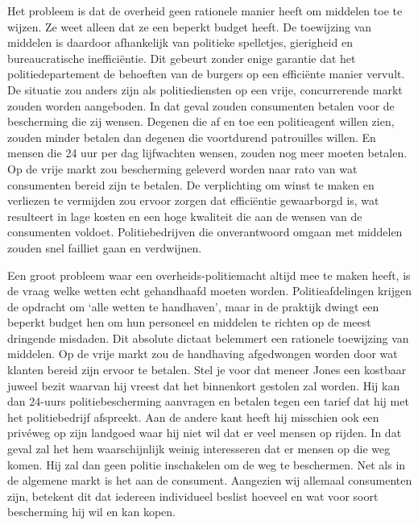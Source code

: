 \documentclass[
  a5paper,
  smalldemyvopaper,10pt,twoside,onecolumn,openright,extrafontsizes,hidelinks]{memoir}
\begin{document}
Het probleem is dat de overheid geen rationele manier heeft om middelen
toe te wijzen. Ze weet alleen dat ze een beperkt budget heeft. De
toewijzing van middelen is daardoor afhankelijk van politieke
spelletjes, gierigheid en bureaucratische inefficiëntie. Dit gebeurt
zonder enige garantie dat het politiedepartement de behoeften van de
burgers op een efficiënte manier vervult. De situatie zou anders zijn
als politiediensten op een vrije, concurrerende markt zouden worden
aangeboden. In dat geval zouden consumenten betalen voor de bescherming
die zij wensen. Degenen die af en toe een politieagent willen zien,
zouden minder betalen dan degenen die voortdurend patrouilles willen. En
mensen die 24 uur per dag lijfwachten wensen, zouden nog meer moeten
betalen. Op de vrije markt zou bescherming geleverd worden naar rato van
wat consumenten bereid zijn te betalen. De verplichting om winst te
maken en verliezen te vermijden zou ervoor zorgen dat efficiëntie
gewaarborgd is, wat resulteert in lage kosten en een hoge kwaliteit die
aan de wensen van de consumenten voldoet. Politiebedrijven die
onverantwoord omgaan met middelen zouden snel failliet gaan en
verdwijnen.

Een groot probleem waar een overheids-politiemacht altijd mee te maken
heeft, is de vraag welke wetten echt gehandhaafd moeten worden.
Politieafdelingen krijgen de opdracht om `alle wetten te handhaven',
maar in de praktijk dwingt een beperkt budget hen om hun personeel en
middelen te richten op de meest dringende misdaden. Dit absolute dictaat
belemmert een rationele toewijzing van middelen. Op de vrije markt zou
de handhaving afgedwongen worden door wat klanten bereid zijn ervoor te
betalen. Stel je voor dat meneer Jones een kostbaar juweel bezit waarvan
hij vreest dat het binnenkort gestolen zal worden. Hij kan dan 24-uurs
politiebescherming aanvragen en betalen tegen een tarief dat hij met het
politiebedrijf afspreekt. Aan de andere kant heeft hij misschien ook een
privéweg op zijn landgoed waar hij niet wil dat er veel mensen op
rijden. In dat geval zal het hem waarschijnlijk weinig interesseren dat
er mensen op die weg komen. Hij zal dan geen politie inschakelen om de
weg te beschermen. Net als in de algemene markt is het aan de consument.
Aangezien wij allemaal consumenten zijn, betekent dit dat iedereen
individueel beslist hoeveel en wat voor soort bescherming hij wil en kan
kopen.
\end{document}
